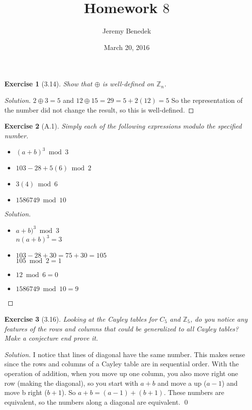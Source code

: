 \documentclass{article}
\title{Homework $8$}
\author{Jeremy Benedek}
\date{March 20, 2016}
\newtheorem*{ex}{Exercise}
\newenvironment{solution}
  {\begin{proof}[Solution]}
  {\renewcommand{\qedsymbol}{}\end{proof}}
\begin{document}
\maketitle

\begin{ex}[3.14]
	Show that $\oplus$ is well-defined on $\mathbb{Z}_n$.
\end{ex}
\begin{solution}
	$2\oplus3=5$ and $12\oplus 15 = 29 = 5 + 2(12) = 5$
	So the representation of the number did not change the 
	result, so this is well-defined.
\end{solution}

\begin{ex}[A.1]
	Simply each of the following expressions modulo the specified
	number. \begin{itemize}
	  \item $(a+b)^3 \bmod 3$
	  \item $103-28+5(6) \bmod 2$
	  \item $3(4) \bmod 6$
	  \item $1586749 \bmod 10$
	\end{itemize}
\end{ex}
\begin{solution}
	\begin{itemize}
	  \item $a+b)^3 \bmod 3$ \\ $n(a+b)^3 = 3$
	  \item $103-28+30 = 75+30 = 105$ \\ $105 \bmod 2 = 1$
	  \item $12 \bmod 6 = 0$
	  \item $1586749 \bmod 10 = 9$
	\end{itemize}
\end{solution}

\begin{ex}[3.16]
	Looking at the Cayley tables for $C_5$ and $\mathbb{Z}_5$, do you
	notice any features of the rows and columns that could be
	generalized to all Cayley tables? Make a conjecture end prove
	it.
\end{ex}
\begin{solution}
	I  notice that lines of diagonal have the same number. This makes
	sense since the rows and columns of a Cayley table are in
	sequential order. With the operation of addition, when you
	move up one column, you also move right one row (making the 
	diagonal), so you start with $a+b$ and move a up ($a-1$) and
	move b right ($b+1$). So $a+b = (a-1) + (b+1)$. These
	numbers are equivalent, so the numbers along a diagonal are equivalent.
	\qed
\end{solution}
\end{document}
